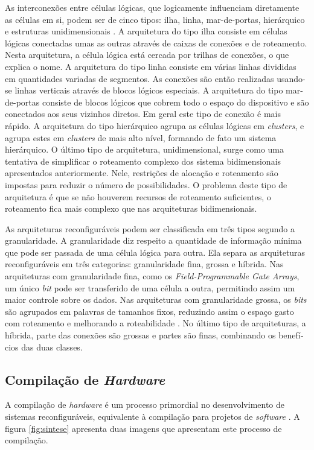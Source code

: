\documentclass[11pt,a4paper,oneside]{book}
\begin{document}
As interconex\~oes entre c\'elulas l\'ogicas, que logicamente influenciam diretamente as c\'elulas em si, podem ser de cinco tipos: ilha, linha, mar-de-portas, hier\'arquico e estruturas unidimensionais \cite{vassiliadis2007fine}.
A arquitetura do tipo ilha consiste em c\'elulas l\'ogicas conectadas umas as outras atrav\'es de caixas de conex\~oes e de roteamento.
Nesta arquitetura, a c\'elula l\'ogica est\'a cercada por trilhas de conex\~oes, o que explica o nome.
A arquitetura do tipo linha consiste em v\'arias linhas divididas em quantidades variadas de segmentos.
As conex\~oes s\~ao ent\~ao realizadas usando-se linhas verticais atrav\'es de blocos l\'ogicos especiais.
A arquitetura do tipo mar-de-portas consiste de blocos l\'ogicos que cobrem todo o espa\c{c}o do dispositivo e s\~ao conectados aos seus vizinhos diretos.
Em geral este tipo de conex\~ao \'e mais r\'apido.
A arquitetura do tipo hier\'arquico agrupa as c\'elulas l\'ogicas em \textit{clusters}, e agrupa estes em \textit{clusters} de mais alto n\'i­vel, formando de fato um sistema hier\'arquico.
O \'ultimo tipo de arquitetura, unidimensional, surge como uma tentativa de simplificar o roteamento complexo dos sistema bidimensionais apresentados anteriormente.
Nele, restri\c{c}\~oes de aloca\c{c}\~ao e roteamento s\~ao impostas para reduzir o n\'umero de possibilidades.
O problema deste tipo de arquitetura \'e que se n\~ao houverem recursos de roteamento suficientes, o roteamento fica mais complexo que nas arquiteturas bidimensionais.

As arquiteturas reconfigur\'aveis podem ser classificada em tr\^es tipos segundo a granularidade.
A granularidade diz respeito a quantidade de informa\c{c}\~ao m\'i­nima que pode ser passada de uma c\'elula l\'ogica para outra.
Ela separa as arquiteturas reconfigur\'aveis em tr\^es categorias: granularidade fina, grossa e h\'i­brida.
Nas arquiteturas com granularidade fina, como os \textit{Field-Programmable Gate Arrays}, um \'unico \textit{bit} pode ser transferido de uma c\'elula a outra, permitindo assim um maior controle sobre os dados.
Nas arquiteturas com granularidade grossa, os \textit{bits} s\~ao agrupados em palavras de tamanhos fixos, reduzindo assim o espa\c{c}o gasto com roteamento e melhorando a roteabilidade \cite{Hartenstein2001}.
No \'ultimo tipo de arquiteturas, a h\'i­brida, parte das conex\~oes s\~ao grossas e partes s\~ao finas, combinando os benef\'i­cios das duas classes.

\subsection{Compilação de \textit{Hardware}}
A compilação de \textit{hardware} é um processo primordial no desenvolvimento de sistemas reconfiguráveis, equivalente à compilação para projetos de \textit{software} \cite{Hauck2007}.
A figura \ref{fig:sintese} apresenta duas imagens que apresentam este processo de compilação.
\end{document}
